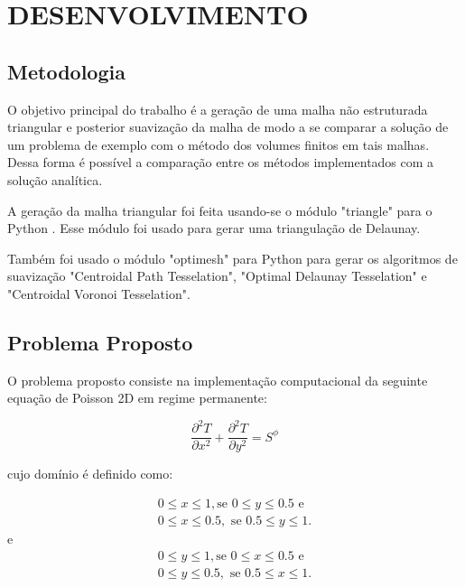\chapter[DESENVOLVIMENTO]{DESENVOLVIMENTO}

\section{Metodologia}
O objetivo principal do trabalho é a geração de uma malha não estruturada triangular e posterior suavização da malha de modo a se comparar a solução de um problema de exemplo com o método dos volumes finitos em tais malhas. Dessa forma é possível a comparação entre os métodos implementados com a solução analítica.

A geração da malha triangular foi feita usando-se o módulo "triangle" para o Python \cite{shewchuk96b}. Esse módulo foi usado para gerar uma triangulação de Delaunay.

Também foi usado o módulo "optimesh" para Python para gerar os algoritmos de suavização "Centroidal Path Tesselation", "Optimal Delaunay Tesselation" e "Centroidal Voronoi Tesselation".

\section{Problema Proposto}

O problema proposto consiste na implementação computacional da seguinte equação de Poisson 2D em regime permanente:

\begin{equation*}
    \frac{\partial^2 T}{\partial x^2} + \frac{\partial^2 T}{\partial y^2} = S^\phi
\end{equation*}

cujo domínio é definido como:

\begin{equation*}
\begin{split}
    0\leq x \leq 1, \text{se } 0 \leq y \leq 0.5 \text{ e}\\
    0 \leq x \leq 0.5, \text{ se } 0.5 \leq y \leq 1.
\end{split}
\end{equation*}
e
\begin{equation*}
\begin{split}
    0\leq y \leq 1, \text{se } 0 \leq x \leq 0.5 \text{ e}\\
    0 \leq y \leq 0.5, \text{ se } 0.5 \leq x \leq 1.
\end{split}
\end{equation*}

